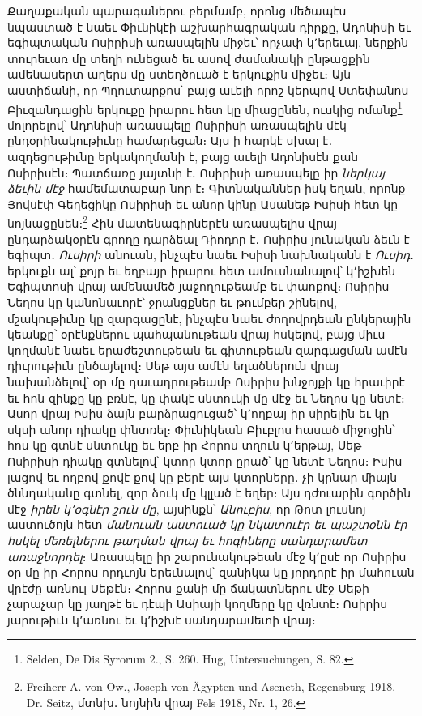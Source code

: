 \documentclass{article}
\begin{document}
{Քաղաքական պարագաներու բերմամբ, որոնց մեծապէս նպաստած է նաեւ Փիւնիկէի աշխարհագրական դիրքը, Ադոնիսի եւ եգիպտական Ոսիրիսի առասպելին միջեւ՝ որչափ կ՚երեւայ, ներքին տուրեւառ մը տեղի ունեցած եւ ասով ժամանակի ընթացքին ամենասերտ աղերս մը ստեղծուած է երկուքին միջեւ։ Այն աստիճանի, որ Պղուտարքոս՝ բայց աւելի որոշ կերպով Ստեփանոս Բիւզանդացին երկուքը իրարու հետ կը միացընեն, ուսկից ոմանք\footnote{Selden, De Dis Syrorum 2., S. 260. Hug, Untersuchungen, S. 82.} մոլորելով՝ Ադոնիսի առասպելը Ոսիրիսի առասպելին մէկ ընդօրինակութիւնը համարեցան։ Այս ի հարկէ սխալ է․ ազդեցութիւնը երկակողմանի է, բայց աւելի Ադոնիսէն քան Ոսիրիսէն։ Պատճառը յայտնի է․ Ոսիրիսի առասպելը իր \emph{ներկայ ձեւին մէջ} համեմատաբար նոր է։ Գիտնականներ իսկ եղան, որոնք Յովսէփ Գեղեցիկը Ոսիրիսի եւ անոր կինը Ասանեթ Իսիսի հետ կը նոյնացընեն։\footnote{Freiherr A. von Ow., Joseph von Ägypten und Aseneth, Regensburg 1918. — Dr. Seitz, մտնխ․ նոյնին վրայ Fels 1918, Nr. 1, 26.} Հին մատենագիրներէն առասպելիս վրայ ընդարձակօրէն գրողը դարձեալ Դիոդոր է․ Ոսիրիս յունական ձեւն է եգիպտ․ \emph{Ուսիրի} անուան, ինչպէս նաեւ Իսիսի նախնականն է \emph{Ուսիդ}․ երկուքն ալ՝ քոյր եւ եղբայր իրարու հետ ամուսնանալով՝ կ՚իշխեն Եգիպտոսի վրայ ամենամեծ յաջողութեամբ եւ փաոքով։ Ոսիրիս Նեղոս կը կանոնաւորէ՝ ջրանցքներ եւ թումբեր շինելով, մշակութիւնը կը զարգացընէ, ինչպէս նաեւ ժողովրդեան ընկերային կեանքը՝ օրէնքներու պահպանութեան վրայ հսկելով, բայց միւս կողմանէ նաեւ երաժեշտութեան եւ գիտութեան զարգացման ամէն դիւրութիւն ընծայելով։ Սեթ այս ամէն եղածներուն վրայ նախանձելով՝ օր մը դաւադրութեամբ Ոսիրիս խնջոյքի կը հրաւիրէ եւ հոն զինքը կը բռնէ, կը փակէ սնտուկի մը մէջ եւ Նեղոս կը նետէ։ Ասոր վրայ Իսիս ձայն բարձրացուցած՝ կ՚ողբայ իր սիրելին եւ կը սկսի անոր դիակը փնտռել։ Փիւնիկեան Բիւբլոս հասած միջոցին՝ հոս կը գտնէ սնտուկը եւ երբ իր Հորոս տղուն կ՚երթայ, Սեթ Ոսիրիսի դիակը գտնելով՝ կտոր կտոր ըրած՝ կը նետէ Նեղոս։ Իսիս լացով եւ ողբով քովէ քով կը բերէ այս կտորները․ չի կրնար միայն ծննդականը գտնել, զոր ձուկ մը կլլած է եղեր։ Այս դժուարին գործին մէջ \emph{իրեն կ՚օգնէր շուն մը}, այսինքն՝ \emph{Անուբիս}, որ Թոտ լուսնոյ աստուծոյն հետ \emph{մանուան աստուած կը նկատուէր եւ պաշտօնն էր հսկել մեռելներու թաղման վրայ եւ հոգիները սանդարամետ առաջնորդել}։ Առասպելը իր շարունակութեան մէջ կ՚ըսէ որ Ոսիրիս օր մը իր Հորոս որդւոյն երեւնալով՝ զանիկա կը յորդորէ իր մահուան վրէժը առնուլ Սեթէն։ Հորոս քանի մը ճակատներու մէջ Սեթի չարաչար կը յաղթէ եւ դէպի Ասիայի կողմերը կը վռնտէ։ Ոսիրիս յարութիւն կ՚առնու եւ կ՚իշխէ սանդարամետի վրայ։

}
\end{document}
